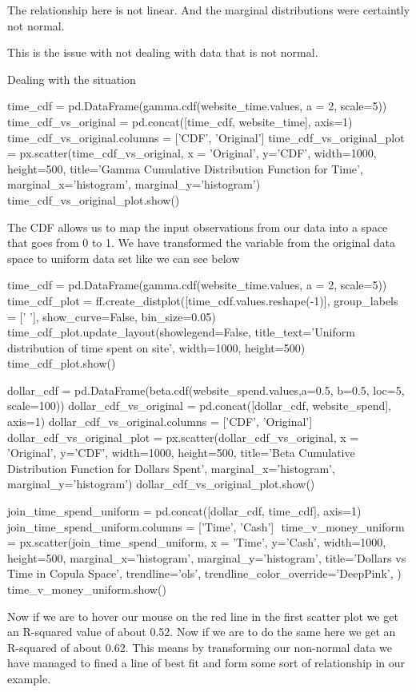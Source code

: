 The relationship here is not linear. And the marginal distributions were certaintly not normal.

This is the issue with not dealing with data that is not normal.

Dealing with the situation

time_cdf =  pd.DataFrame(gamma.cdf(website_time.values, a = 2, scale=5))
time_cdf_vs_original = pd.concat([time_cdf, website_time], axis=1)
time_cdf_vs_original.columns = ['CDF', 'Original']
​
time_cdf_vs_original_plot = px.scatter(time_cdf_vs_original, x = 'Original', y='CDF', width=1000, height=500, title='Gamma Cumulative Distribution Function for Time',  marginal_x='histogram', marginal_y='histogram')
time_cdf_vs_original_plot.show()

The CDF allows us to map the input observations from our data into a space that goes from 0 to 1. We have transformed the variable from the original data space to uniform data set like we can see below

time_cdf =  pd.DataFrame(gamma.cdf(website_time.values, a = 2, scale=5))
time_cdf_plot  = ff.create_distplot([time_cdf.values.reshape(-1)], group_labels = [' '], show_curve=False, bin_size=0.05)
time_cdf_plot.update_layout(showlegend=False, title_text='Uniform distribution of time spent on site', width=1000, height=500)
time_cdf_plot.show()

dollar_cdf = pd.DataFrame(beta.cdf(website_spend.values,a=0.5, b=0.5, loc=5, scale=100))
dollar_cdf_vs_original = pd.concat([dollar_cdf, website_spend], axis=1)
dollar_cdf_vs_original.columns = ['CDF', 'Original']
​
dollar_cdf_vs_original_plot = px.scatter(dollar_cdf_vs_original, x = 'Original', y='CDF', width=1000, height=500, title='Beta Cumulative Distribution Function for Dollars Spent',  marginal_x='histogram', marginal_y='histogram')
dollar_cdf_vs_original_plot.show()

join_time_spend_uniform = pd.concat([dollar_cdf, time_cdf], axis=1)
join_time_spend_uniform.columns = ['Time', 'Cash']
​
time_v_money_uniform = px.scatter(join_time_spend_uniform, x = 'Time', y='Cash', width=1000, height=500,  marginal_x='histogram', marginal_y='histogram', title='Dollars vs Time in Copula Space', trendline='ols', trendline_color_override='DeepPink', )
time_v_money_uniform.show()

Now if we are to hover our mouse on the red line in the first scatter plot we get an R-squared value of about 0.52. Now if we are to do the same here we get an R-squared of about 0.62. This means by transforming our non-normal data we have managed to fined a line of best fit and form some sort of relationship in our example.

